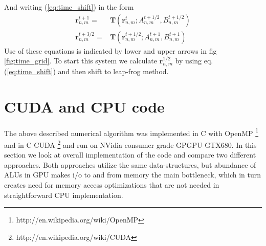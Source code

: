 \documentclass[40pt,letterpaper,physrev]{article}
\begin{document}
	\begin{minipage}{\linewidth}
	\label{fig:time_grid}
	\end{minipage}
	And writing (\ref{eq:time_shift}) in the form
	\begin{align}
		\mathbf{r}^{t+1}_{n,m}=&\mathbf{T}(\mathbf{r}^t_{n,m};A^{t+1/2}_{n,m},B^{t+1/2}_{n,m}) \label{eq:leap_frog_shift_1} \\
		\mathbf{r}^{t+3/2}_{n,m}=&\mathbf{T}(\mathbf{r}^{t+1/2}_{n,m};A^{t+1}_{n,m},B^{t+1}_{n,m}) \label{eq:leap_frog_shift_2}
	\end{align}
	Use of these equations is indicated by lower and upper arrows in fig \ref{fig:time_grid}. To start this system we calculate $\mathbf{r}^{1/2}_{n,m}$ by using eq. (\ref{eq:time_shift}) and then shift to leap-frog method.
    \section{CUDA and CPU code}
    The above described numerical algorithm was implemented in C with 
    OpenMP \footnote{http://en.wikipedia.org/wiki/OpenMP} and in 
    C CUDA \footnote{http://en.wikipedia.org/wiki/CUDA} and run on NVidia consumer grade GPGPU GTX680. 
    In this section we look at overall implementation of the code and compare two different approaches.
    Both approaches utilize the same data-structures, but abundance of ALUs in GPU makes i/o to and from memory 
    the main bottleneck, which in turn creates need for memory access optimizations that are not needed in 
    straightforward CPU implementation. 
    
\end{document}
